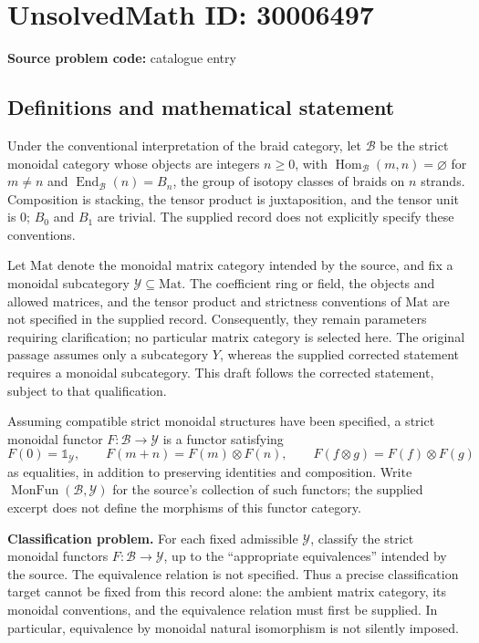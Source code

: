 \documentclass[11pt]{article}
\begin{document}
\section*{UnsolvedMath ID: 30006497}
\textbf{Source problem code:} catalogue entry
\subsection{Definitions and mathematical statement}
Under the conventional interpretation of the braid category, let \(\mathcal B\) be the strict monoidal category whose objects are integers \(n\geq 0\), with \(\operatorname{Hom}_{\mathcal B}(m,n)=\varnothing\) for \(m\neq n\) and \(\operatorname{End}_{\mathcal B}(n)=B_n\), the group of isotopy classes of braids on \(n\) strands. Composition is stacking, the tensor product is juxtaposition, and the tensor unit is \(0\); \(B_0\) and \(B_1\) are trivial. The supplied record does not explicitly specify these conventions.

Let \(\mathrm{Mat}\) denote the monoidal matrix category intended by the source, and fix a monoidal subcategory \(\mathcal Y\subseteq\mathrm{Mat}\). The coefficient ring or field, the objects and allowed matrices, and the tensor product and strictness conventions of \(\mathrm{Mat}\) are not specified in the supplied record. Consequently, they remain parameters requiring clarification; no particular matrix category is selected here. The original passage assumes only a subcategory \(Y\), whereas the supplied corrected statement requires a monoidal subcategory. This draft follows the corrected statement, subject to that qualification.

Assuming compatible strict monoidal structures have been specified, a strict monoidal functor \(F:\mathcal B\to\mathcal Y\) is a functor satisfying
\[
F(0)=\mathbb 1_{\mathcal Y},\qquad
F(m+n)=F(m)\otimes F(n),\qquad
F(f\otimes g)=F(f)\otimes F(g)
\]
as equalities, in addition to preserving identities and composition. Write \(\operatorname{MonFun}(\mathcal B,\mathcal Y)\) for the source's collection of such functors; the supplied excerpt does not define the morphisms of this functor category.

\textbf{Classification problem.} For each fixed admissible \(\mathcal Y\), classify the strict monoidal functors \(F:\mathcal B\to\mathcal Y\), up to the ``appropriate equivalences'' intended by the source. The equivalence relation is not specified. Thus a precise classification target cannot be fixed from this record alone: the ambient matrix category, its monoidal conventions, and the equivalence relation must first be supplied. In particular, equivalence by monoidal natural isomorphism is not silently imposed.
\end{document}
